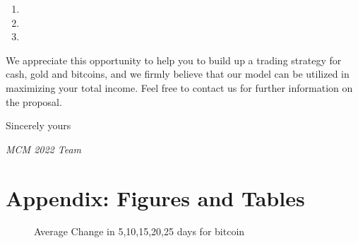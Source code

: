 \documentclass[12pt,a4paper]{article}
\begin{document}
\begin{spacing}{1.2}
\begin{enumerate}
	\item 
	
	\item
	
	\item
\end{enumerate}

We appreciate this opportunity to help you to build up a trading strategy for cash, gold and bitcoins, and we firmly believe that our model can be utilized in maximizing your total income. Feel free to contact us for further information on the proposal.

Sincerely yours

\textit{MCM 2022 Team}



\end{spacing}


\newpage
\appendix
\addtocounter{page}{-1}
\thispagestyle{empty}

\section*{Appendix: Figures and Tables}
\label{sec:AppendixFT}

\begin{figure}[H]
	\caption{ Average Change in 5,10,15,20,25 days for bitcoin}
	\label{figure:bitcoin_ac}
\end{figure}
\end{document}
